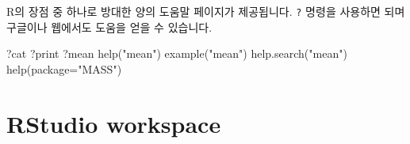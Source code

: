 \documentclass[
]{book}
\newenvironment{Shaded}{\begin{snugshade}}{\end{snugshade}}
\newcommand{\AttributeTok}[1]{\textcolor[rgb]{0.77,0.63,0.00}{#1}}
\newcommand{\FunctionTok}[1]{\textcolor[rgb]{0.00,0.00,0.00}{#1}}
\newcommand{\NormalTok}[1]{#1}
\newcommand{\StringTok}[1]{\textcolor[rgb]{0.31,0.60,0.02}{#1}}
\begin{document}
R의 장점 중 하나로 방대한 양의 도움말 페이지가 제공됩니다. \texttt{?} 명령을 사용하면 되며 구글이나 웹에서도 도움을 얻을 수 있습니다.

\begin{Shaded}
\begin{Highlighting}[]
\NormalTok{?cat}
\NormalTok{?print}
\NormalTok{?mean}
\FunctionTok{help}\NormalTok{(}\StringTok{"mean"}\NormalTok{)}
\FunctionTok{example}\NormalTok{(}\StringTok{"mean"}\NormalTok{)}
\FunctionTok{help.search}\NormalTok{(}\StringTok{"mean"}\NormalTok{)}
\FunctionTok{help}\NormalTok{(}\AttributeTok{package=}\StringTok{"MASS"}\NormalTok{)}
\end{Highlighting}
\end{Shaded}

\hypertarget{rstudio-workspace}{%
\section{RStudio workspace}\label{rstudio-workspace}}
\end{document}
